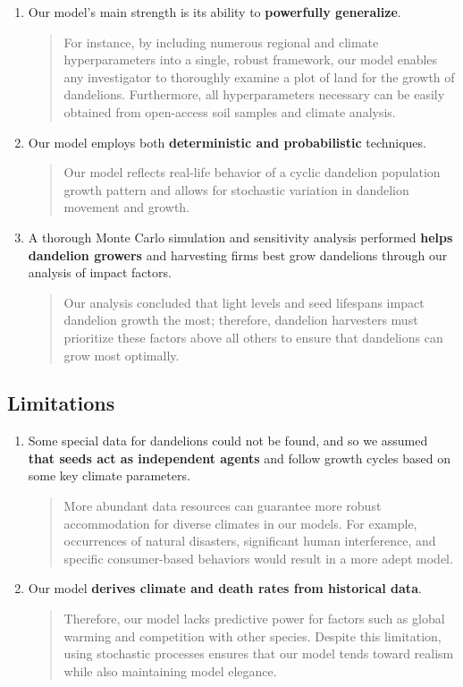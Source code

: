 \begin{enumerate}
 \item Our model’s main strength is its ability to \textbf{powerfully generalize}.
    \begin{quote}
        For instance, by including numerous regional and climate hyperparameters into a single, robust framework, our model enables any investigator to thoroughly examine a plot of land for the growth of dandelions. Furthermore, all hyperparameters necessary can be easily obtained from open-access soil samples and climate analysis.
    \end{quote}
\item  Our model employs both \textbf{deterministic and probabilistic} techniques.
\begin{quote}
    Our model reflects real-life behavior of a cyclic dandelion population growth pattern and allows for stochastic variation in dandelion movement and growth.
\end{quote}

\item A thorough Monte Carlo simulation and sensitivity analysis performed \textbf{helps dandelion growers} and harvesting firms best grow dandelions through our analysis of impact factors.
\begin{quote}
    Our analysis concluded that light levels and seed lifespans impact dandelion growth the most; therefore, dandelion harvesters must prioritize these factors above all others to ensure that dandelions can grow most optimally.
\end{quote}
\end{enumerate}

\subsection{Limitations}
\begin{enumerate}
\item Some special data for dandelions could not be found, and so we assumed \textbf{that seeds act as independent agents} and follow growth cycles based on some key climate parameters. 
\begin{quote}
    More abundant data resources can guarantee more robust accommodation for diverse climates in our models. For example, occurrences of natural disasters, significant human interference, and specific consumer-based behaviors would result in a more adept model. 
\end{quote}

\item Our model \textbf{derives climate and death rates from historical data}.
\begin{quote}
    Therefore, our model lacks predictive power for factors such as global warming and competition with other species. Despite this limitation, using stochastic processes ensures that our model tends toward realism while also maintaining model elegance.
\end{quote}
\end{enumerate}

